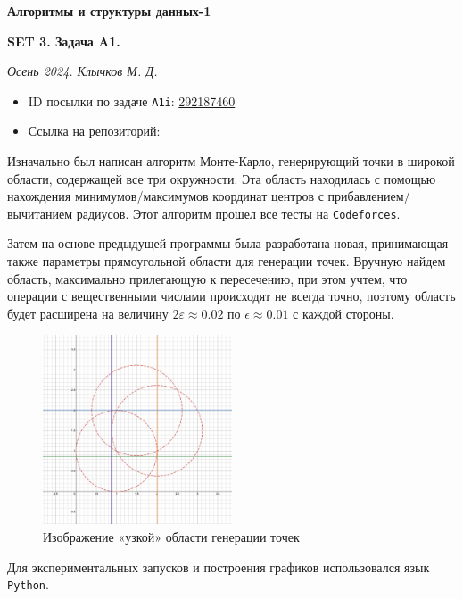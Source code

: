\documentclass[11pt,a4paper]{scrarticle}
\author{Клычков Максим Дмитриевич}
\theoremstyle{definition}
\begin{document}
\centerline{\textbf{\huge Алгоритмы и структуры данных-1}}
\centerline{\textbf{SET 3. Задача A1.}}
\begin{flushright}
	\emph{Осень 2024. Клычков М. Д.}
\end{flushright}

\begin{itemize}
	\item ID посылки по задаче \texttt{A1i}: \href{https://dsahse.contest.codeforces.com/group/NOflOR1Qt0/contest/565612/submission/292187460}{292187460}
	\item Ссылка на репозиторий:
\end{itemize}

Изначально был написан алгоритм Монте-Карло, генерирующий точки в широкой области, содержащей все три окружности. Эта область находилась с помощью нахождения минимумов/максимумов координат центров с прибавлением/вычитанием радиусов. Этот алгоритм прошел все тесты на \texttt{Codeforces}.

Затем на основе предыдущей программы была разработана новая, принимающая также параметры прямоугольной области для генерации точек. Вручную найдем область, максимально прилегающую к пересечению, при этом учтем, что операции с вещественными числами происходят не всегда точно, поэтому область будет расширена на величину $2\varepsilon \approx 0.02$ по $\epsilon \approx 0.01$ с каждой стороны.

\begin{figure}[htp]
	\centering
	\includegraphics[width=0.5\textwidth]{../static/desmos-graph.png}
	\caption{Изображение «узкой» области генерации точек}
	\label{fig:desmos}
\end{figure}

Для экспериментальных запусков и построения графиков использовался язык \texttt{Python}.
\end{document}

